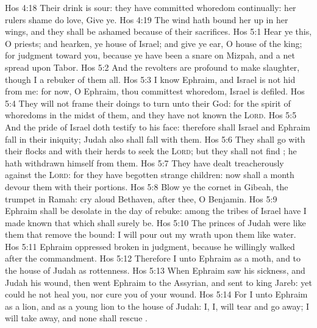 \vs Hos 4:18 Their drink is sour: they have committed whoredom continually: her rulers  shame do love, Give ye.
\vs Hos 4:19 The wind hath bound her up in her wings, and they shall be ashamed because of their sacrifices.
\vs Hos 5:1 Hear ye this, O priests; and hearken, ye house of Israel; and give ye ear, O house of the king; for judgment  toward you, because ye have been a snare on Mizpah, and a net spread upon Tabor.
\vs Hos 5:2 And the revolters are profound to make slaughter, though I  a rebuker of them all.
\vs Hos 5:3 I know Ephraim, and Israel is not hid from me: for now, O Ephraim, thou committest whoredom,  Israel is defiled.
\vs Hos 5:4 They will not frame their doings to turn unto their God: for the spirit of whoredoms  in the midst of them, and they have not known the \textsc{Lord}.
\vs Hos 5:5 And the pride of Israel doth testify to his face: therefore shall Israel and Ephraim fall in their iniquity; Judah also shall fall with them.
\vs Hos 5:6 They shall go with their flocks and with their herds to seek the \textsc{Lord}; but they shall not find ; he hath withdrawn himself from them.
\vs Hos 5:7 They have dealt treacherously against the \textsc{Lord}: for they have begotten strange children: now shall a month devour them with their portions.
\vs Hos 5:8 Blow ye the cornet in Gibeah,  the trumpet in Ramah: cry aloud  Bethaven, after thee, O Benjamin.
\vs Hos 5:9 Ephraim shall be desolate in the day of rebuke: among the tribes of Israel have I made known that which shall surely be.
\vs Hos 5:10 The princes of Judah were like them that remove the bound:  I will pour out my wrath upon them like water.
\vs Hos 5:11 Ephraim  oppressed  broken in judgment, because he willingly walked after the commandment.
\vs Hos 5:12 Therefore  I  unto Ephraim as a moth, and to the house of Judah as rottenness.
\vs Hos 5:13 When Ephraim saw his sickness, and Judah  his wound, then went Ephraim to the Assyrian, and sent to king Jareb: yet could he not heal you, nor cure you of your wound.
\vs Hos 5:14 For I  unto Ephraim as a lion, and as a young lion to the house of Judah: I,  I, will tear and go away; I will take away, and none shall rescue .
